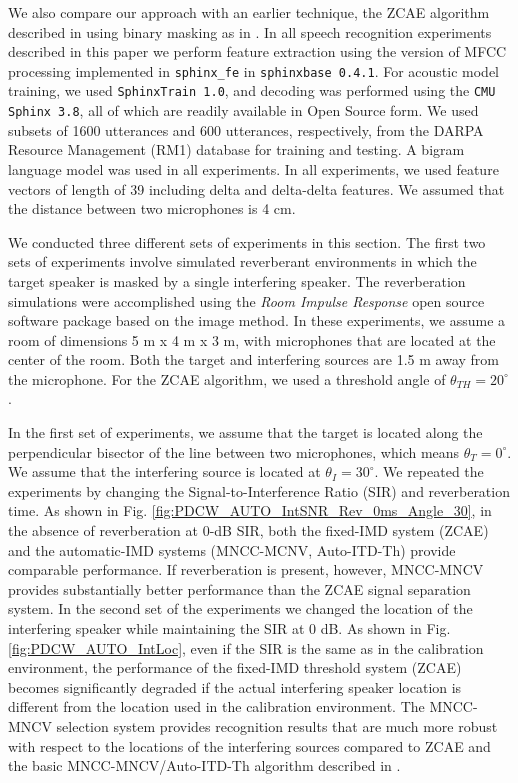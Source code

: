 \documentclass{article}
\begin{document}
 We also  compare our approach with an earlier  technique, the ZCAE algorithm
 described in  \cite{H_Park_SpeechComm_2009} 
using binary masking as in \cite{C_Kim_INTERSPEECH_2010_1}. In all speech recognition experiments described in this paper we perform feature extraction using  the version of MFCC processing implemented in  \texttt{sphinx\_fe} in \texttt{sphinxbase 0.4.1}.
For acoustic model training, we used \texttt{SphinxTrain 1.0}, and decoding was
performed using the  \texttt{CMU Sphinx 3.8}, all of which are readily available in Open Source form.
 We used subsets of 1600 utterances and 600 utterances, respectively, from the DARPA Resource Management (RM1) database for training and testing.
A bigram language model was used in all experiments. In all experiments, we used feature vectors
of length of 39 including delta and delta-delta features. We assumed that the distance between two microphones is 4 cm.

We conducted three different sets of experiments in this section.
The first two sets of experiments involve   simulated reverberant environments in which the target speaker is
masked by a single interfering speaker. 
 The reverberation simulations were accomplished using the \emph{Room Impulse Response} open source software package \cite{RIR} based on the image method.
   In these experiments, we assume a room of
dimensions 5 m x 4 m x 3 m, with microphones that are located at the center of the room.
Both the target and interfering sources are 1.5 m away from the microphone.
For the ZCAE algorithm, we used a threshold angle of  $\theta_{TH} = 20 ^ {\circ}$.

In the first set of experiments, we assume that the target is located along the perpendicular bisector of the 
line between two microphones, which means $\theta_T = 0^{\circ}$. We assume
that the interfering source is located at $\theta_I = 30^{\circ}$. We repeated the
experiments by changing the Signal-to-Interference Ratio (SIR) and reverberation time.
As shown in Fig. \ref{fig:PDCW_AUTO_IntSNR_Rev_0ms_Angle_30}, in the absence of
reverberation at 0-dB SIR, both the fixed-IMD system (ZCAE) and the automatic-IMD
systems (MNCC-MCNV, Auto-ITD-Th) provide comparable performance.   If   reverberation is present, however, 
MNCC-MNCV provides substantially better performance than the ZCAE signal separation system. 
In the second set of the experiments we changed the location of the interfering speaker while maintaining
the SIR   at 0 dB. As shown in Fig. \ref{fig:PDCW_AUTO_IntLoc}, even if the SIR is the same as in the calibration environment,
the performance of the fixed-IMD threshold system (ZCAE) becomes significantly degraded   if the actual interfering speaker
location is different from the location used in the calibration environment.   The MNCC-MNCV selection system
provides recognition results that are much more robust with respect to the locations of the interfering sources compared to ZCAE and the basic MNCC-MNCV/Auto-ITD-Th algorithm described in \cite{C_Kim_INTERSPEECH_2010_1}.  %
\end{document}
